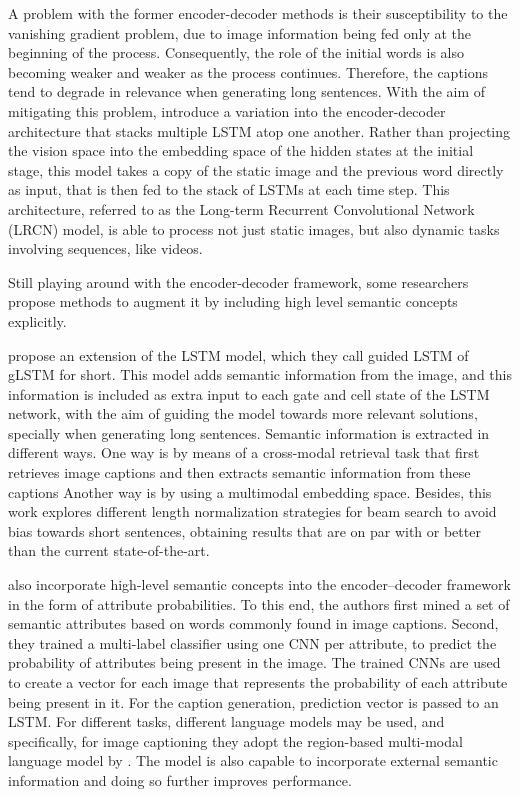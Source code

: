 A problem with the former encoder-decoder methods is their susceptibility to the vanishing gradient problem, due to  image information being fed only at the beginning of the process. Consequently, the role of the initial words is also becoming weaker and weaker as the process continues. Therefore, the captions tend to degrade in relevance when generating long sentences. With the aim of mitigating this problem, \citet{Donahue2015} introduce a variation into the encoder-decoder architecture that stacks multiple LSTM atop one another. Rather than projecting the vision space into the embedding space of the hidden states at the initial stage, this model takes a copy of the static image and the previous word directly as input, that is then fed to the stack of LSTMs at each time step. This architecture, referred to as the Long-term Recurrent Convolutional Network (LRCN) model, is able to process not just static images, but also dynamic tasks involving sequences, like videos.

Still playing around with the encoder-decoder framework, some researchers propose methods to augment it by including high level semantic concepts explicitly. 

\citet{Jia2015} propose an extension of the LSTM model, which they call guided LSTM of gLSTM for short. This model adds semantic information from the image, and this information is included as extra input to each gate and cell state of the LSTM network, with the aim of guiding the model towards more relevant solutions, specially when generating long sentences. Semantic information is extracted in different ways. One way is by means of a cross-modal retrieval task that first retrieves image captions and then extracts semantic information from these captions Another way is by using a multimodal embedding space. Besides, this work explores different length normalization strategies for beam search to avoid bias towards short sentences, obtaining results that are on par with or better than the current state-of-the-art.

\citet{Wu2016} also incorporate high-level semantic concepts into the encoder–decoder framework in the form of attribute probabilities. To this end, the authors first mined a set of semantic attributes based on words commonly found in image captions. Second, they trained a multi-label classifier using one CNN per attribute, to predict the probability of attributes being present in the image. The trained CNNs are used to create a vector for each image that represents the probability of each attribute being present in it. For the caption generation, prediction vector is passed to an LSTM. For different tasks, different language models may be used, and specifically, for image captioning they adopt the region-based multi-modal language model by \citet{Vinyals2015}. The model is also capable to incorporate external semantic information and doing so further improves performance.

